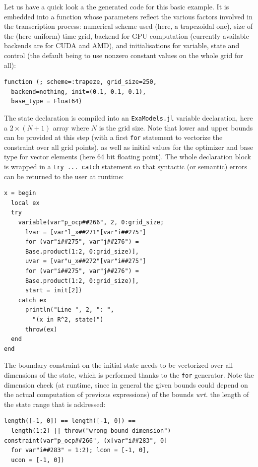 Let us have a quick look a the generated code for this basic example. It is embedded into a function whose parameters reflect the various factors involved in the transcription process: numerical scheme used (here, a trapezoidal one), size of the (here uniform) time grid, backend for GPU computation (currently available backends are for CUDA and AMD), and initialisations for variable, state and control (the default being to use nonzero constant values on the whole grid for all):

{\small
\begin{verbatim}
function (; scheme=:trapeze, grid_size=250,
  backend=nothing, init=(0.1, 0.1, 0.1),
  base_type = Float64)
\end{verbatim}
}

\noindent The state declaration is compiled into an \texttt{ExaModels.jl} variable declaration, here a $2 \times (N + 1)$ array where $N$ is the grid size. Note that lower and upper bounds can be provided at this step (with a first \verb+for+ statement to vectorize the constraint over all grid points), as well as initial values for the optimizer and base type for vector elements (here 64 bit floating point). The whole declaration block is wrapped in a \verb+try ... catch+ statement so that syntactic (or semantic) errors can be returned to the user at runtime:

{\small
\begin{verbatim}
x = begin
  local ex
  try
    variable(var"p_ocp##266", 2, 0:grid_size;
      lvar = [var"l_x##271"[var"i##275"]
      for (var"i##275", var"j##276") =
      Base.product(1:2, 0:grid_size)],
      uvar = [var"u_x##272"[var"i##275"]
      for (var"i##275", var"j##276") =
      Base.product(1:2, 0:grid_size)],
      start = init[2])
    catch ex
      println("Line ", 2, ": ",
        "(x in R^2, state)")
      throw(ex)
  end
end
\end{verbatim}
}

\noindent The boundary constraint on the initial state needs to be vectorized over all dimensions of the state, which is performed thanks to the \verb+for+ generator. Note the dimension check (at runtime, since in general the given bounds could depend on the actual computation of previous expressions) of the bounds \emph{wrt.} the length of the state range that is addressed:
{\small
\begin{verbatim}
length([-1, 0]) == length([-1, 0]) ==
  length(1:2) || throw("wrong bound dimension")
constraint(var"p_ocp##266", (x[var"i##283", 0]
  for var"i##283" = 1:2); lcon = [-1, 0],
  ucon = [-1, 0])
\end{verbatim}
}

